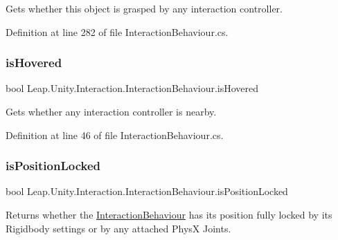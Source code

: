 Gets whether this object is grasped by any interaction controller. 



Definition at line 282 of file Interaction\+Behaviour.\+cs.

\mbox{\label{class_leap_1_1_unity_1_1_interaction_1_1_interaction_behaviour_ae8875ff423f6183c256101320ff28fa7}} 
\subsubsection{\texorpdfstring{isHovered}{isHovered}}
{\footnotesize\ttfamily bool Leap.\+Unity.\+Interaction.\+Interaction\+Behaviour.\+is\+Hovered\hspace{0.3cm}{\ttfamily [get]}}



Gets whether any interaction controller is nearby. 



Definition at line 46 of file Interaction\+Behaviour.\+cs.

\mbox{\label{class_leap_1_1_unity_1_1_interaction_1_1_interaction_behaviour_aa2fe2de792e74492e4eb4079aacd3b6e}} 
\subsubsection{\texorpdfstring{isPositionLocked}{isPositionLocked}}
{\footnotesize\ttfamily bool Leap.\+Unity.\+Interaction.\+Interaction\+Behaviour.\+is\+Position\+Locked\hspace{0.3cm}{\ttfamily [get]}}



Returns whether the \mbox{\hyperlink{class_leap_1_1_unity_1_1_interaction_1_1_interaction_behaviour}{Interaction\+Behaviour}} has its position fully locked by its Rigidbody settings or by any attached PhysX Joints. 

